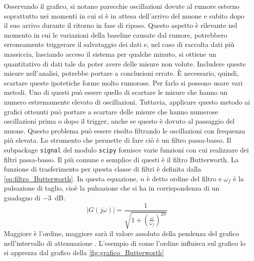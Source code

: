 Osservando il grafico, si notano parecchie oscillazioni dovute al rumore esterno soprattutto nei momenti in cui si è in attesa dell'arrivo
del muone e subito dopo il suo arrivo durante il ritorno in fase di riposo. Questo aspetto è rilevante nel momento in cui le variazioni
della baseline causate dal rumore, potrebbero erroneamente triggerare il salvataggio dei dati e, nel caso di raccolta dati più massiccia,
lasciando acceso il sistema per qualche minuto, si ottiene un quantitativo di dati tale da poter avere delle misure non volute. Includere
queste misure nell'analisi, potrebbe portare a conclusioni errate. È necessario, quindi, scartare queste ipotetiche forme molto
rumorose. Per farlo si possono usare vari metodi. Uno di questi può essere quello di scartare le misure che hanno un numero
estremamente elevato di oscillazioni. Tuttavia, applicare questo metodo ai grafici ottenuti può portare a scartare delle misure che hanno
numerose oscillazioni prima o dopo il trigger, anche se questo è dovuto al passaggio del muone. Questo problema può essere risolto
filtrando le oscillazioni con frequenza più elevata. Lo strumento che permette di fare ciò
è un filtro passa-basso. Il subpackage \texttt{signal} del modulo \texttt{scipy} fornisce varie funzioni con cui realizzare dei filtri
passa-basso. Il più comune e semplice di questi è il filtro Butterworth. La funzione di trasferimento per questa classe di filtri è definita
dalla \autoref*{eq:filtro_Butterworth}. In questa equazione, $n$ è detto ordine del filtro e $\omega_f$ è la pulsazione di taglio, cioè la
pulsazione che si ha in corrispondenza di un guadagno di \SI{-3}{\dB}.
\begin{equation}
    \left | G(j \omega) \right | = {\frac{1}{\sqrt{ 1 + \left ( \frac{\omega}{\omega_f} \right ) ^ {2 n}} } }
    \label{eq:filtro_Butterworth}
\end{equation}
Maggiore è l'ordine, maggiore sarà il valore assoluto della pendenza del grafico nell'intervallo di attenuazione \cite{deluca_sistemi}. L'esempio di come l'ordine
influisca sul grafico lo si apprezza dal grafico della \autoref*{fig:grafico_Butterworth}

